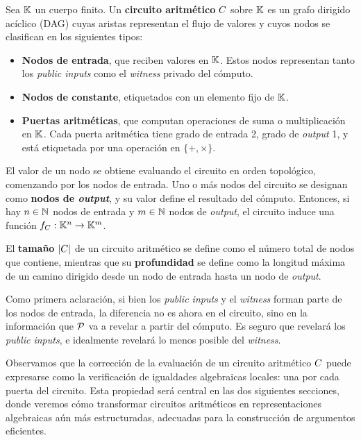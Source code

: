 \begin{definition}
\label{def:apendice-b-arithmetic-circuits-circuito-aritmetico}
	Sea $\mathbb{K}$ un cuerpo finito. Un \textbf{circuito aritmético} $C$ sobre $\mathbb{K}$ es un grafo dirigido acíclico (DAG) cuyas aristas representan el flujo de valores y cuyos nodos se clasifican en los siguientes tipos:
	\begin{itemize}[noitemsep]
		\item \textbf{Nodos de entrada}, que reciben valores en $\mathbb{K}$. Estos nodos representan tanto los \textit{public inputs} como el \textit{witness} privado del cómputo.
		\item \textbf{Nodos de constante}, etiquetados con un elemento fijo de $\mathbb{K}$.
			\item \textbf{Puertas aritméticas}, que computan operaciones de suma o multiplicación en $\mathbb{K}$. Cada puerta aritmética tiene grado de entrada 2, grado de \textit{output} 1, y está etiquetada por una operación en $\{+, \times\}$.
	\end{itemize}
	
			El valor de un nodo se obtiene evaluando el circuito en orden topológico, comenzando por los nodos de entrada. Uno o más nodos del circuito se designan como \textbf{nodos de \textit{output}}, y su valor define el resultado del cómputo. Entonces, si hay $n \in \mathbb{N}$ nodos de entrada y $m \in \mathbb{N}$ nodos de \textit{output}, el circuito induce una función $f_C : \mathbb{K}^n \to \mathbb{K}^m$.
	
	El \textbf{tamaño} $|C|$ de un circuito aritmético se define como el número total de nodos que contiene, mientras que su \textbf{profundidad} se define como la longitud máxima de un camino dirigido desde un nodo de entrada hasta un nodo de \textit{output}.
\end{definition}

Como primera aclaración, si bien los \textit{public inputs} y el \textit{witness} forman parte de los nodos de entrada, la diferencia no es ahora en el circuito, sino en la información que $\mathcal{P}$ va a revelar a partir del cómputo. Es seguro que revelará los \textit{public inputs}, e idealmente revelará lo menos posible del \textit{witness}.

Observamos que la corrección de la evaluación de un circuito aritmético $C$ puede expresarse como la verificación de igualdades algebraicas locales: una por cada puerta del circuito. Esta propiedad será central en las dos siguientes secciones, donde veremos cómo transformar circuitos aritméticos en representaciones algebraicas aún más estructuradas, adecuadas para la construcción de argumentos \SNARK eficientes.

